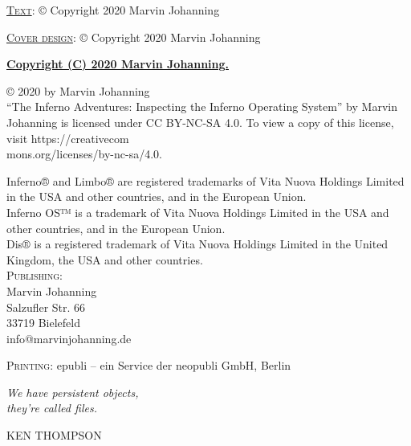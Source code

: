 \documentclass[a5paper,twoside,12pt]{report}
\newlength\longest
\begin{document}
\thispagestyle{empty}
\noindent\textsc{\underline{Text}}: © Copyright 2020 Marvin Johanning

\noindent\textsc{\underline{Cover design}}: © Copyright 2020 Marvin Johanning

\vspace{8mm}\noindent\textbf{\underline{Copyright (C) 2020 Marvin Johanning.}}

\noindent© 2020 by Marvin Johanning\\``The Inferno Adventures: Inspecting the Inferno Operating System'' by Marvin Johanning is licensed under CC BY-NC-SA 4.0. To view a copy of this license, visit https://creativecom\\mons.org/licenses/by-nc-sa/4.0.

\vspace{10mm}\noindent
Inferno® and Limbo® are registered trademarks of Vita Nuova Holdings Limited in the USA and other countries, and in the European Union.\\
Inferno OS™ is a trademark of Vita Nuova Holdings Limited in the USA and other countries, and in the European Union.\\
Dis® is a registered trademark of Vita Nuova Holdings Limited in the United Kingdom, the USA and other countries.\\

\vspace{10mm}\noindent\textsc{Publishing}: \\
Marvin Johanning\\
Salzufler Str. 66\\
33719 Bielefeld\\
info@marvinjohanning.de

\vspace{5mm}\noindent\textsc{Printing}: epubli – ein Service der neopubli GmbH, Berlin
\newpage

\clearpage
\thispagestyle{empty}
\null\vfill
\settowidth{}
\begin{center}
\parbox{\longest}{%
  \raggedright{\huge\itshape%
    We have persistent objects, \\they're called files. \par\bigskip
  }
  \raggedleft\Large\MakeUppercase{Ken Thompson}\par%
}
\vfill\vfill
\clearpage\newpage
\end{center}
\newpage
\end{document}
